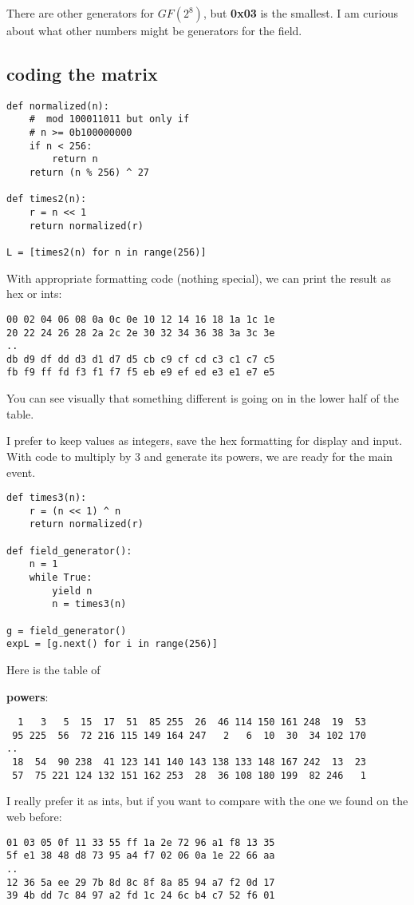 \documentclass[11pt, oneside]{article}
\begin{document}
There are other generators for $GF(2^8)$, but \textbf{0x03} is the smallest.  I am curious about what other numbers might be generators for the field.

\subsection*{coding the matrix}

\begin{verbatim}
def normalized(n):
    #  mod 100011011 but only if
    # n >= 0b100000000
    if n < 256:
        return n
    return (n % 256) ^ 27

def times2(n):
    r = n << 1
    return normalized(r)

L = [times2(n) for n in range(256)]
\end{verbatim}
With appropriate formatting code (nothing special), we can print the result as hex or ints:
\begin{verbatim}
00 02 04 06 08 0a 0c 0e 10 12 14 16 18 1a 1c 1e
20 22 24 26 28 2a 2c 2e 30 32 34 36 38 3a 3c 3e
..
db d9 df dd d3 d1 d7 d5 cb c9 cf cd c3 c1 c7 c5
fb f9 ff fd f3 f1 f7 f5 eb e9 ef ed e3 e1 e7 e5 
\end{verbatim}
You can see visually that something different is going on in the lower half of the table.  

I prefer to keep values as integers, save the hex formatting for display and input.  With code to multiply by $3$ and generate its powers, we are ready for the main event.
\begin{verbatim}
def times3(n):
    r = (n << 1) ^ n
    return normalized(r) 

def field_generator():
    n = 1
    while True:
        yield n
        n = times3(n)

g = field_generator()
expL = [g.next() for i in range(256)]
\end{verbatim}

Here is the table of

\textbf{powers}:
\begin{verbatim}
  1   3   5  15  17  51  85 255  26  46 114 150 161 248  19  53
 95 225  56  72 216 115 149 164 247   2   6  10  30  34 102 170
..
 18  54  90 238  41 123 141 140 143 138 133 148 167 242  13  23
 57  75 221 124 132 151 162 253  28  36 108 180 199  82 246   1
\end{verbatim}

I really prefer it as ints, but if you want to compare with the one we found on the web before:
\begin{verbatim}
01 03 05 0f 11 33 55 ff 1a 2e 72 96 a1 f8 13 35
5f e1 38 48 d8 73 95 a4 f7 02 06 0a 1e 22 66 aa
..
12 36 5a ee 29 7b 8d 8c 8f 8a 85 94 a7 f2 0d 17
39 4b dd 7c 84 97 a2 fd 1c 24 6c b4 c7 52 f6 01
\end{verbatim}
\end{document}
